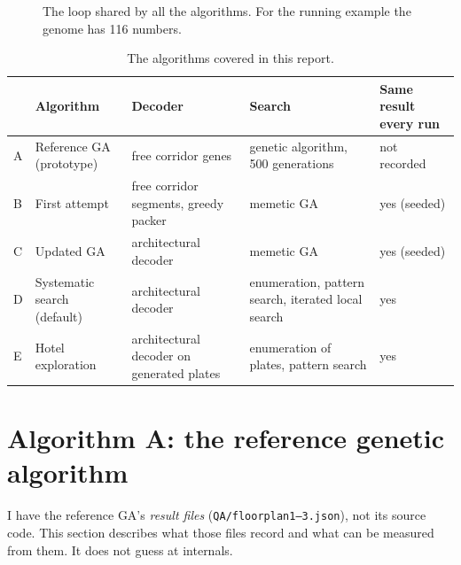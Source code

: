 \documentclass[10pt,a4paper]{article}
\newcommand{\code}[1]{\texttt{\small #1}}
\begin{document}
\begin{figure}[H]\centering
{}
\caption{The loop shared by all the algorithms. For the running example the genome has 116 numbers.}\label{fig:loop}
\end{figure}

\begin{table}[H]\centering\small\caption{The algorithms covered in this report.}\label{tab:algs}
\begin{tabular}{@{}l p{3.3cm} p{4.3cm} p{4.6cm} p{2.3cm}@{}}
\toprule
\textbf{} & \textbf{Algorithm} & \textbf{Decoder} & \textbf{Search} & \textbf{Same result every run} \\ \midrule
A & Reference GA (prototype) & free corridor genes & genetic algorithm, 500 generations & not recorded \\
B & First attempt & free corridor segments, greedy packer & memetic GA & yes (seeded) \\
C & Updated GA & architectural decoder & memetic GA & yes (seeded) \\
D & Systematic search (default) & architectural decoder & enumeration, pattern search, iterated local search & yes \\
E & Hotel exploration & architectural decoder on generated plates & enumeration of plates, pattern search & yes \\
\bottomrule
\end{tabular}
\end{table}


\section{Algorithm A: the reference genetic algorithm}\label{sec:ref}
\begin{note}
I have the reference GA's \emph{result files} (\code{QA/floorplan1--3.json}), not its source code. This section
describes what those files record and what can be measured from them. It does not guess at internals.
\end{note}
\end{document}
